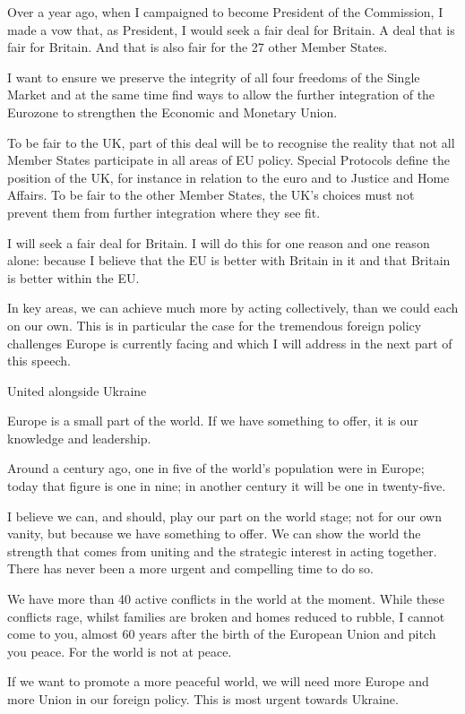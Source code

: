 \documentclass[a4paper,11pt]{article}
\begin{document}
Over a year ago, when I campaigned to become President of the Commission, I made a vow that, as President, I would seek a fair deal for Britain. A deal that is fair for Britain. And that is also fair for the 27 other Member States.

I want to ensure we preserve the integrity of all four freedoms of the Single Market and at the same time find ways to allow the further integration of the Eurozone to strengthen the Economic and Monetary Union.

To be fair to the UK, part of this deal will be to recognise the reality that not all Member States participate in all areas of EU policy. Special Protocols define the position of the UK, for instance in relation to the euro and to Justice and Home Affairs. To be fair to the other Member States, the UK's choices must not prevent them from further integration where they see fit.

I will seek a fair deal for Britain. I will do this for one reason and one reason alone: because I believe that the EU is better with Britain in it and that Britain is better within the EU.

In key areas, we can achieve much more by acting collectively, than we could each on our own. This is in particular the case for the tremendous foreign policy challenges Europe is currently facing and which I will address in the next part of this speech.

 

United alongside Ukraine

Europe is a small part of the world. If we have something to offer, it is our knowledge and leadership.

Around a century ago, one in five of the world’s population were in Europe; today that figure is one in nine; in another century it will be one in twenty-five.

I believe we can, and should, play our part on the world stage; not for our own vanity, but because we have something to offer. We can show the world the strength that comes from uniting and the strategic interest in acting together. There has never been a more urgent and compelling time to do so.

We have more than 40 active conflicts in the world at the moment. While these conflicts rage, whilst families are broken and homes reduced to rubble, I cannot come to you, almost 60 years after the birth of the European Union and pitch you peace. For the world is not at peace.

If we want to promote a more peaceful world, we will need more Europe and more Union in our foreign policy. This is most urgent towards Ukraine.
\end{document}
